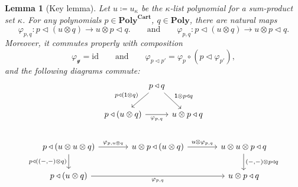 \documentclass[11pt, one side, article]{memoir}
\theoremstyle{definition}
\theoremstyle{plain}
\newtheorem{lemma}[definitionx]{Lemma}
\newcommand{\Cat}[1]{\mathbf{#1}}%
\newcommand{\id}{\mathrm{id}}
\newcommand{\yon}{\mathcal{y}}
\newcommand{\poly}{\Cat{Poly}}
\newcommand{\polycart}{\poly^{\Cat{Cart}}}
\newcommand{\0}{\textsf{0}}
\newcommand{\1}{\tn{\textsf{1}}}
\newcommand{\tri}{\mathbin{\triangleleft}}
\newcommand{\qqand}{\qquad\text{and}\qquad}
\begin{document}
\begin{lemma}[Key lemma]\label{lemma.key}
Let $u\coloneqq u_\kappa$ be the $\kappa$-list polynomial for a sum-product set $\kappa$. For any polynomials $p\in\polycart$, $q\in\poly$, there are natural maps 
\[
	\varphi_{p,q}\colon p\tri(u\otimes q)\to u\otimes p\tri q.
	\qqand
	\varphi_{p,q}\colon p\tri(u\otimes q)\to u\otimes p\tri q.
\] 
Moreover, it commutes properly with composition
\[
	\varphi_{\yon}=\id
	\qqand
	\varphi_{p\tri p'}=\varphi_{p}\circ (p\tri\varphi_{p'}),
\]
and the following diagrams commute:
\begin{gather*}
\begin{tikzcd}[column sep=0, ampersand replacement=\&]
	\&p\tri q\ar[dl, "p\tri(\1\otimes q)"']\ar[dr,"\1\otimes p\tri q"]\\
	p\tri(u\otimes q)\ar[rr, "\varphi_{p,q}"']\&\&u\otimes p\tri q
\end{tikzcd}
\\[15pt]
\begin{tikzcd}[, ampersand replacement=\&, column sep=large]
	p\tri(u\otimes u\otimes q)\ar[r, "\varphi_{p,u\otimes q}"]\ar[d, "p\tri{((-,-)\otimes q)}"']\&
	u\otimes p\tri(u\otimes q)\ar[r, "u\otimes\varphi_{p,q}"]\&
	u\otimes u\otimes p\tri q\ar[d, "{(-,-)}\otimes p\tri q"]\\
	p\tri (u\otimes q)\ar[rr, "\varphi_{p,q}"']\&\&
	u\otimes p\tri q
\end{tikzcd}
\end{gather*}
\end{lemma}
\end{document}
